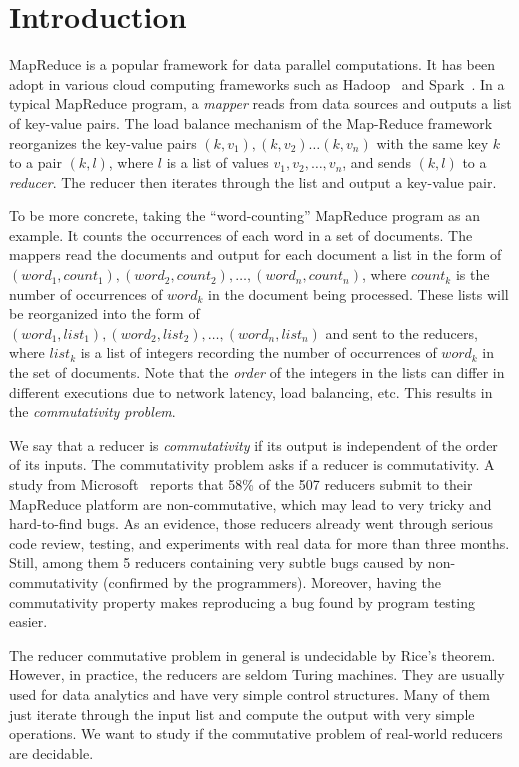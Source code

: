 
\section{Introduction}
MapReduce is a  popular framework for data parallel computations. It has been adopt in various cloud computing frameworks such as Hadoop~\cite{Hadoop} and Spark~\cite{Spark}. In a typical MapReduce program, a \emph{mapper} reads from data sources and outputs a list of key-value pairs. 
The load balance mechanism of the Map-Reduce framework reorganizes the key-value pairs $(k, v_1), (k,v_2)\ldots(k,v_n)$ with the same key $k$ to a pair $(k,l)$, where $l$ is a list of values $v_1,v_2,\ldots,v_n$, and sends $(k,l)$ to a \emph{reducer}. The reducer then iterates through the list and output a key-value pair.

To be more concrete, taking the ``word-counting'' MapReduce program as an example. It counts the occurrences of each word in a set of documents. The mappers read the documents and output for each document a list in the form of $(word_1, count_1), (word_2, count_2), \ldots, (word_n, count_n)$, where $count_k$ is the number of occurrences of $word_k$ in the document being processed. These lists will be reorganized into the form of $(word_1, list_1), (word_2,list_2), \ldots, (word_n,list_n)$ and sent to the reducers, where $list_k$ is a list of integers recording the number of occurrences of $word_k$ in the set of documents. Note that the \emph{order} of the integers in the lists can differ in different executions due to network latency, load balancing, etc.
This results in the \emph{commutativity problem}.

We say that a reducer is \emph{commutativity} if its output is independent of the order of its inputs. The commutativity problem asks if a reducer is commutativity. A study from Microsoft~\cite{XZZ+14} reports that 58\% of the 507 reducers submit to their MapReduce platform are non-commutative, which may lead to very tricky and hard-to-find bugs.
As an evidence, those reducers already went through serious code review, testing, and experiments with real data for more than three months. Still, among them 5 reducers containing very subtle bugs caused by non-commutativity (confirmed by the programmers). 
Moreover, having the commutativity property makes reproducing a bug found by program testing easier.

The reducer commutative problem in general is undecidable by Rice's theorem. However, in practice, the reducers are seldom Turing machines. They are usually used for data analytics and have very simple control structures. Many of them just iterate through the input list and compute the output with very simple operations.
We want to study if the commutative problem of real-world reducers are decidable.

